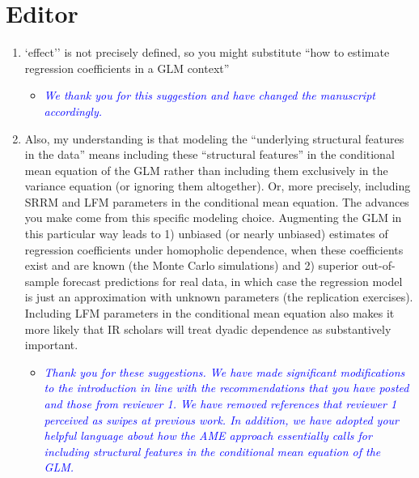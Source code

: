 \section*{Editor}

\begin{enumerate}
	\item `effect'' is not precisely defined, so you might substitute ``how to estimate regression coefficients in a GLM context''
	\begin{itemize}
		\item \textcolor{blue}{ \emph{
		We thank you for this suggestion and have changed the manuscript accordingly.}}
	\end{itemize}
	\item Also, my understanding is that modeling the ``underlying structural features in the data'' means including these ``structural features'' in the conditional mean equation of the GLM rather than including them exclusively in the variance equation (or ignoring them altogether). Or, more precisely, including SRRM and LFM parameters in the conditional mean equation. The advances you make come from this specific modeling choice. Augmenting the GLM in this particular way leads to 1) unbiased (or nearly unbiased) estimates of regression coefficients under homopholic dependence, when these coefficients exist and are known (the Monte Carlo simulations) and 2) superior out-of-sample forecast predictions for real data, in which case the regression model is just an approximation with unknown parameters (the replication exercises). Including LFM parameters in the conditional mean equation also makes it more likely that IR scholars will treat dyadic dependence as substantively important.
	\begin{itemize}
		\item \textcolor{blue}{ \emph{
			Thank you for these suggestions. We have made significant modifications to the introduction in line with the recommendations that you have posted and those from reviewer 1. We have removed references that reviewer 1 perceived as swipes at previous work. In addition, we have adopted your helpful language about how the AME approach essentially calls for including structural features in the conditional mean equation of the GLM. 
			}}
	\end{itemize}
\end{enumerate}

